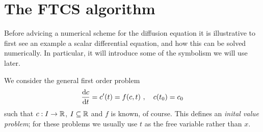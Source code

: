 
\section{The FTCS algorithm} \label{sect:ftcs}
Before advicing a numerical scheme for the diffusion equation it is
illustrative to first see an example a scalar differential equation, and how this 
can be solved numerically. In particular, it will introduce some of the symbolism we will use 
later.

We consider the general first order problem 
\begin{equation}
  \label{eq:I:difscalar}
  \frac{\mathrm{d} c}{\mathrm{d} t} = c'(t) = f(c, t) \ , \ \ \ c(t_0)=c_0
\end{equation}
such that $c: I \rightarrow \mathbb{R}$, $I \subseteq \mathbb{R}$ and $f$ is known, of course. 
This defines an \emph{inital value problem}; for these problems we usually use $t$ 
as the free variable rather than $x$. 

